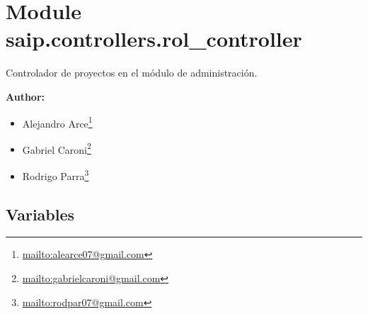 %
%
%


\section{Module saip.controllers.rol\_controller}

    \label{saip:controllers:rol_controller}
Controlador de proyectos en el módulo de administración.

\textbf{Author:} \begin{itemize}
\setlength{\parskip}{0.6ex}
  \item Alejandro 
    Arce\footnote{\href{mailto:alearce07@gmail.com}{mailto:alearce07@gmail.com}}

  \item Gabriel 
    Caroni\footnote{\href{mailto:gabrielcaroni@gmail.com}{mailto:gabrielcaroni@gmail.com}}

  \item Rodrigo 
    Parra\footnote{\href{mailto:rodpar07@gmail.com}{mailto:rodpar07@gmail.com}}

\end{itemize}





  \subsection{Variables}

